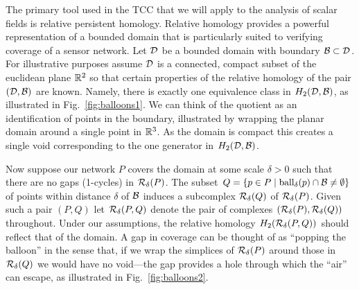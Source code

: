 
The primary tool used in the TCC that we will apply to the analysis of scalar fields is relative persistent homology.
Relative homology provides a powerful representation of a bounded domain that is particularly suited to verifying coverage of a sensor network.
Let ${\mathcal{D}}$ be a bounded domain with boundary ${\mathcal{B}}\subset{\mathcal{D}}$.
For illustrative purposes assume ${\mathcal{D}}$ is a connected, compact subset of the euclidean plane $\mathbb{R}^2$ so that certain properties of the relative homology of the pair $({\mathcal{D}}, {\mathcal{B}})$ are known.
Namely, there is exactly one equivalence class in $H_2({\mathcal{D}}, {\mathcal{B}})$, as illustrated in Fig.~\ref{fig:balloons1}.
We can think of the quotient as an identification of points in the boundary, illustrated by wrapping the planar domain around a single point in $\mathbb{R}^3$.
As the domain is compact this creates a single void corresponding to the one generator in $H_2({\mathcal{D}}, {\mathcal{B}})$.


Now suppose our network $P$ covers the domain at some scale $\delta > 0$ such that there are no gaps (1-cycles) in $\mathcal{R}_\delta(P)$.
The subset $Q = \{p\in P\mid \mathrm{ball}_\delta(p)\cap{\mathcal{B}}\neq\emptyset\}$ of points within distance $\delta$ of ${\mathcal{B}}$ induces a subcomplex $\mathcal{R}_\delta(Q)$ of $\mathcal{R}_\delta(P)$.
Given such a pair $(P, Q)$ let $\mathcal{R}_\delta(P, Q)$ denote the pair of complexes $(\mathcal{R}_\delta(P), \mathcal{R}_\delta(Q))$ throughout.
Under our assumptions, the relative homology $H_2(\mathcal{R}_\delta(P, Q))$ should reflect that of the domain.
A gap in coverage can be thought of as ``popping the balloon'' in the sense that, if we wrap the simplices of $\mathcal{R}_\delta(P)$ around those in $\mathcal{R}_\delta(Q)$ we would have no void---the gap provides a hole through which the ``air'' can escape, as illustrated in Fig.~\ref{fig:balloons2}.

